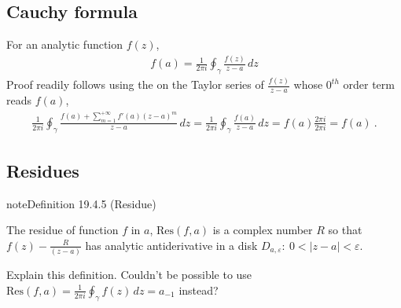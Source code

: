 \documentclass[letterpaper,10pt,english]{jupyterBook}
\begin{document}
\subsection{Cauchy formula}
\label{\detokenize{ch/complex/analysis:cauchy-formula}}\label{\detokenize{ch/complex/analysis:complex-analysis-mero-fun-cauchy-formula}}
\sphinxAtStartPar
For an analytic function \(f(z)\),
\begin{equation*}
\begin{split}f(a) = \frac{1}{2 \pi i} \oint_{\gamma} \frac{f(z)}{z-a} \, dz\end{split}
\end{equation*}
\sphinxAtStartPar
Proof readily follows using the {\hyperref[\detokenize{ch/complex/analysis:complex-analysis-useful-int-path-independence-z-n}]{}} on the Taylor series of \(\frac{f(z)}{z-a}\) whose \(0^{th}\) order term reads \(f(a)\),
\begin{equation*}
\begin{split}\frac{1}{2\pi i} \oint_{\gamma} \frac{f(a)+\sum_{m=1}^{+\infty} f'(a) (z-a)^m}{z-a} \, dz = \frac{1}{2\pi i} \oint_{\gamma} \frac{f(a)}{z-a} \, dz = f(a) \frac{2 \pi i}{2 \pi i} = f(a) \ .\end{split}
\end{equation*}

\subsection{Residues}
\label{\detokenize{ch/complex/analysis:residues}}\label{\detokenize{ch/complex/analysis:complex-analysis-mero-fun-residues}}\label{ch/complex/analysis:definition-5}
\begin{sphinxadmonition}{note}{Definition 19.4.5 (Residue)}



\sphinxAtStartPar
The residue of function \(f\) in \(a\), \(\text{Res}(f,a)\) is a complex number \(R\) so that \(f(z) - \frac{R}{(z-a)}\) has analytic antiderivative in a disk \(D_{a,\varepsilon}: \ 0 < |z-a| < \varepsilon\).
\end{sphinxadmonition}

\sphinxAtStartPar
{} Explain this definition. Couldn’t be possible to use \(\text{Res}(f,a) = \frac{1}{2 \pi i} \oint_{\gamma} f(z) \, dz = a_{-1}\) instead?
\end{document}
